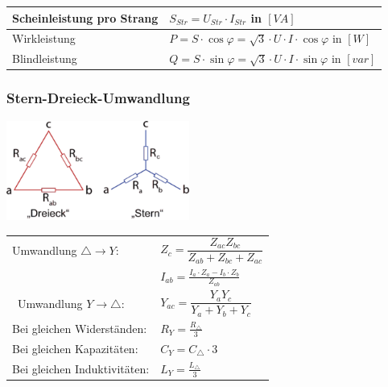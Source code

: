 \begin{tabular}{| p{4.5cm} | l | l |}
            \hline
            Scheinleistung pro Strang &
            \multicolumn{2}{l|}{\hspace{3cm} $S_{Str} = U_{Str} \cdot I_{Str}$ \hspace{0.2cm} in $[VA]$} \\
            \hline
            Wirkleistung &
            \multicolumn{2}{l|}{\hspace{3cm} $P = S \cdot \cos\varphi = \sqrt{3} \cdot U \cdot I \cdot \cos\varphi$ \hspace{0.2cm} in $[W]$} \\
            \hline
            Blindleistung &
            \multicolumn{2}{l|}{\hspace{3cm} $Q = S \cdot \sin\varphi = \sqrt{3} \cdot U \cdot I \cdot \sin\varphi$ \hspace{0.2cm} in $[var]$} \\
            \hline
        \end{tabular}
        \renewcommand{\arraystretch}{1.5}

    \subsubsection{Stern-Dreieck-Umwandlung}
        \begin{minipage}[lt]{7.5 cm}
            \includegraphics[width=6cm]{images/stern-dreieck.png}
        \end{minipage}
        \begin{minipage}[rt]{9.35 cm} %
            \renewcommand{\arraystretch}{2}
            \begin{tabular}{ll}
                Umwandlung $\triangle \rightarrow Y$: &
                $Z_{c} = \dfrac{Z_{ac} Z_{bc}}{Z_{ab}+Z_{bc}+Z_{ac}}$ \\
                & $I_{ab} = \frac{I_a \cdot Z_a - I_b \cdot Z_b}{Z_{ab}}$ \\
\                Umwandlung $Y \rightarrow \triangle$: &
                $Y_{ac}=\dfrac{Y_{a} Y_{c}}{Y_{a}+Y_{b}+Y_{c}}$ \\
                Bei gleichen Widerständen: &
                $R_Y = \frac{R_\triangle}{3}$ \\
                Bei gleichen Kapazitäten: &
                $C_Y = C_\triangle \cdot 3 $ \\
                Bei gleichen Induktivitäten: &
                $L_Y = \frac{L_\triangle}{3}$
            \end{tabular}
            \renewcommand{\arraystretch}{1.5}
        \end{minipage}
       